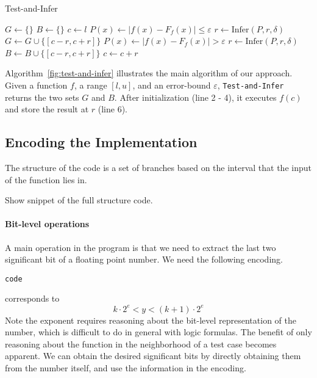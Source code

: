 \begin{algorithm}
  \centering
  \caption{Test-and-Infer}
  \label{fig:test-and-infer}
  \begin{algorithmic}[1]
        \State $G \gets \{\}$
        \State $B \gets \{\}$
        \State $c \gets l$
                \State $P(x) \gets |f(x) - F_f(x)| \le \varepsilon$
                \State $r \gets \mathrm{Infer}(P, r, \delta)$
                \State $G \gets G \cup
                                \{ [c - r, c + r] \}$
            \Else
                \State $P(x) \gets |f(x) - F_f(x)| > \varepsilon$
                \State $r \gets \mathrm{Infer}(P, r, \delta)$
                \State $B \gets B \cup
                                \{ [c - r, c + r] \}$
            \EndIf
            \State $c \gets c + r$
        \EndWhile
    \EndProcedure
  \end{algorithmic}
\end{algorithm}
Algorithm~\ref{fig:test-and-infer} illustrates the main algorithm of our
approach. Given a function $f$, a range $[l, u]$, and an error-bound
$\varepsilon$, \texttt{Test-and-Infer} returns the two sets $G$ and
$B$. After initialization (line 2 - 4), it executes $f(c)$ and store
the result at $r$ (line 6).

\subsection{Encoding the Implementation}

The structure of the code is a set of branches based on the interval that the input of the function lies in. 



Show snippet of the full structure code.

\paragraph{Bit-level operations}
A main operation in the program is that we need to extract the last two significant bit of a floating point number. We need the following encoding. 
\begin{verbatim}
code
\end{verbatim}
corresponds to
\[
k\cdot 2^e< y <(k+1)\cdot 2^e
\]
Note the exponent requires reasoning about the bit-level representation of the number, which is difficult to do in general with logic formulas. The benefit of only reasoning about the function in the neighborhood of a test case becomes apparent. We can obtain the desired significant bits by directly obtaining them from the number itself, and use the information in the encoding. 

